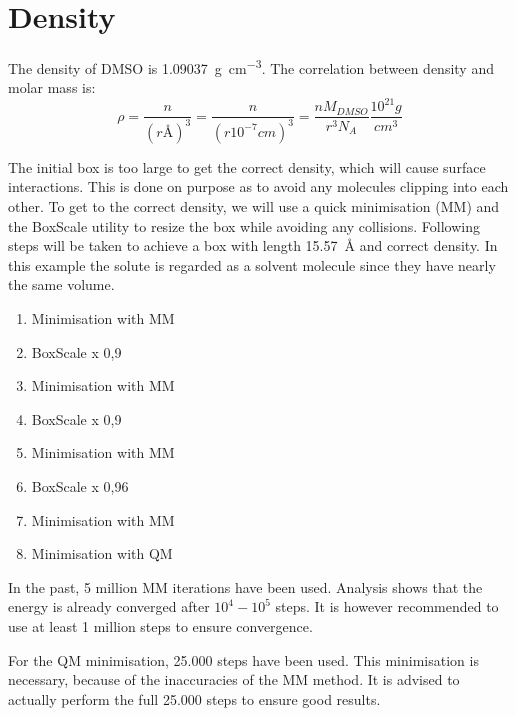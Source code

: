 \documentclass[a4paper,fleqn]{report}
\begin{document}
	\section{Density}
	The density of DMSO is \SI{1,09037}{g cm^{-3}}.\cite{Radhamma2008}
	The correlation between density and molar mass is:
	\begin{equation}
	\rho = \dfrac{n}{(r \si{\angstrom})^3} = \dfrac{n}{(r \si{10^{-7} 
	cm})^3} = \dfrac{n M_{DMSO}}{r^3 N_A} \dfrac{10^{21} g}{cm^3}
	\end{equation}
	
	The initial box is too large to get the correct density, which will cause 
	surface interactions. This is done on purpose as to avoid any molecules 
	clipping into each other. To get to the correct density, we will use a 
	quick minimisation (MM) and the BoxScale utility to resize the box while 
	avoiding any collisions.
	Following steps will be taken to achieve a box with length 
	\SI{15,57}{\angstrom} and correct density. In this example the solute is 
	regarded as a solvent molecule since they have nearly the same volume.
	
	\begin{enumerate}
		\setlength{\itemsep}{-1pt}
		\setlength{\parsep}{-1pt}
		\item Minimisation with MM
		\item BoxScale x 0,9
		\item Minimisation with MM
		\item BoxScale x 0,9
		\item Minimisation with MM
		\item BoxScale x 0,96
		\item Minimisation with MM
		\item Minimisation with QM
	\end{enumerate}
	
	In the past, 5 million MM iterations have been used.
	Analysis shows that the energy is already converged after $10^4 - 10^5$ 
	steps.
	It is however recommended to use at least 1 million steps to ensure 
	convergence.
	
	For the QM minimisation, 25.000 steps have been used. This minimisation is 
	necessary, because of the inaccuracies of the MM method. It is advised to 
	actually perform the full 25.000 steps to ensure good results.

	\newpage
	\begin{spacing}{0.75}
		\label{Referenties}
		\clearpage
		\renewcommand{\bibname}{Referenties}
		
	\end{spacing}
	
	
\end{document}

